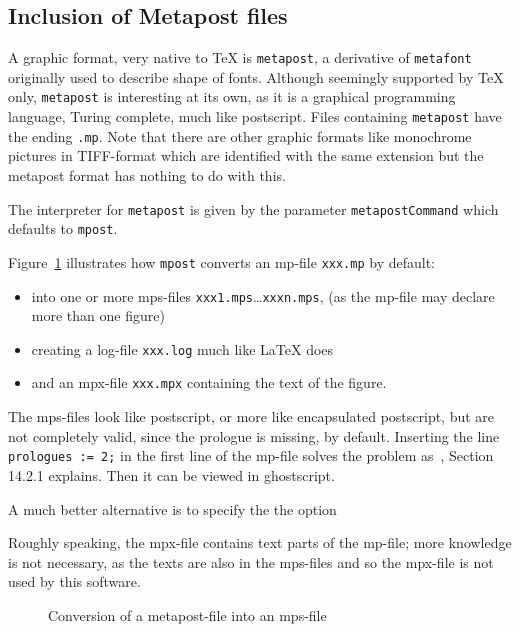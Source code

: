 \documentclass[12pt]{article}
\begin{document}
\subsection{Inclusion of Metapost files}\label{subsec:metapost}

A graphic format, very native to TeX is {\tt metapost}, 
a derivative of {\tt metafont} originally used to describe shape of fonts. 
Although seemingly supported by TeX only, 
{\tt metapost} is interesting at its own, 
as it is a graphical programming language, 
Turing complete, much like postscript. 
Files containing {\tt metapost} have the ending {\tt .mp}. 
Note that there are other graphic formats 
like monochrome pictures in TIFF-format 
which are identified with the same extension 
but the metapost format has nothing to do with this. 

The interpreter for {\tt metapost} 
is given by the parameter {\tt metapostCommand} 
which defaults to {\tt mpost}. 


Figure~\ref{fig:mp2mps} illustrates how {\tt mpost} converts an \gls{mp}-file 
{\tt xxx.mp} by default: 
%
\begin{itemize}
\item
into one or more \gls{mps}-files {\tt xxx1.mps}\dots {\tt xxxn.mps}, 
(as the mp-file may declare more than one figure) 
\item
creating a log-file {\tt xxx.log} much like \LaTeX{} does 
\item
and an \gls{mpx}-file {\tt xxx.mpx} containing the text of the figure. 
\end{itemize}

The mps-files look like postscript, or more like encapsulated postscript, 
but are not completely valid, since the prologue is missing, by default. 
Inserting the line {\tt prologues := 2;} in the first line of the mp-file 
solves the problem as~\cite{MPost}, Section 14.2.1 explains. 
Then it can be viewed in ghostscript. 

A much better alternative is to specify the the option 


Roughly speaking, the mpx-file contains text parts of the mp-file; 
more knowledge is not necessary, as the texts are also in the mps-files 
and so the mpx-file is not used by this software. 

\begin{figure}[htb]
\begin{center}

\end{center}
\caption{\label{fig:mp2mps}Conversion of a metapost-file into an mps-file}
\end{figure}
\end{document}
